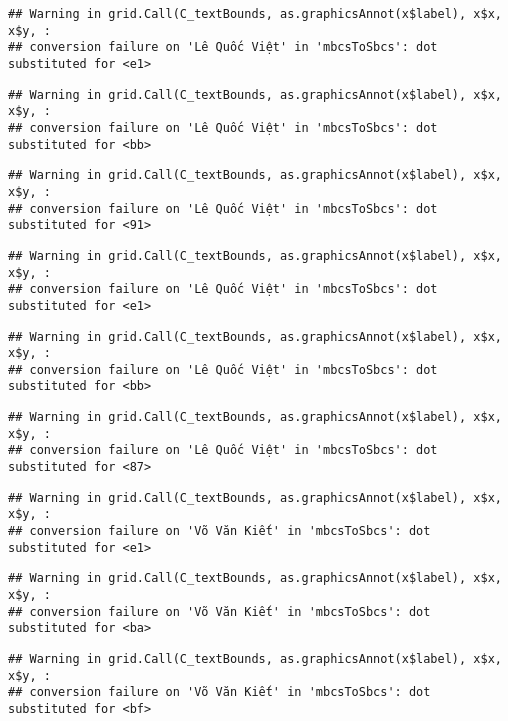 \documentclass[
]{article}
\begin{document}
\begin{verbatim}
## Warning in grid.Call(C_textBounds, as.graphicsAnnot(x$label), x$x, x$y, :
## conversion failure on 'Lê Quốc Việt' in 'mbcsToSbcs': dot substituted for <e1>
\end{verbatim}

\begin{verbatim}
## Warning in grid.Call(C_textBounds, as.graphicsAnnot(x$label), x$x, x$y, :
## conversion failure on 'Lê Quốc Việt' in 'mbcsToSbcs': dot substituted for <bb>
\end{verbatim}

\begin{verbatim}
## Warning in grid.Call(C_textBounds, as.graphicsAnnot(x$label), x$x, x$y, :
## conversion failure on 'Lê Quốc Việt' in 'mbcsToSbcs': dot substituted for <91>
\end{verbatim}

\begin{verbatim}
## Warning in grid.Call(C_textBounds, as.graphicsAnnot(x$label), x$x, x$y, :
## conversion failure on 'Lê Quốc Việt' in 'mbcsToSbcs': dot substituted for <e1>
\end{verbatim}

\begin{verbatim}
## Warning in grid.Call(C_textBounds, as.graphicsAnnot(x$label), x$x, x$y, :
## conversion failure on 'Lê Quốc Việt' in 'mbcsToSbcs': dot substituted for <bb>
\end{verbatim}

\begin{verbatim}
## Warning in grid.Call(C_textBounds, as.graphicsAnnot(x$label), x$x, x$y, :
## conversion failure on 'Lê Quốc Việt' in 'mbcsToSbcs': dot substituted for <87>
\end{verbatim}

\begin{verbatim}
## Warning in grid.Call(C_textBounds, as.graphicsAnnot(x$label), x$x, x$y, :
## conversion failure on 'Võ Văn Kiết' in 'mbcsToSbcs': dot substituted for <e1>
\end{verbatim}

\begin{verbatim}
## Warning in grid.Call(C_textBounds, as.graphicsAnnot(x$label), x$x, x$y, :
## conversion failure on 'Võ Văn Kiết' in 'mbcsToSbcs': dot substituted for <ba>
\end{verbatim}

\begin{verbatim}
## Warning in grid.Call(C_textBounds, as.graphicsAnnot(x$label), x$x, x$y, :
## conversion failure on 'Võ Văn Kiết' in 'mbcsToSbcs': dot substituted for <bf>
\end{verbatim}
\end{document}
